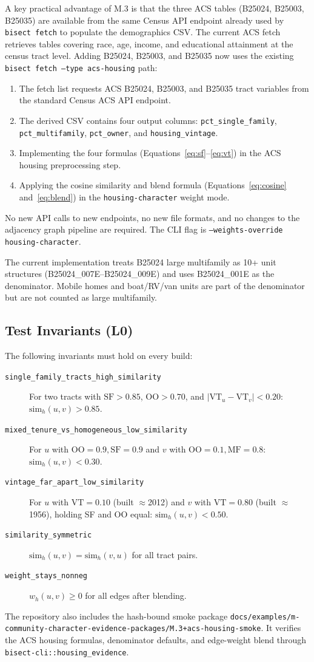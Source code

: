 A key practical advantage of M.3 is that the three ACS tables (B25024, B25003,
B25035) are available from the same Census API endpoint already used by
\texttt{bisect fetch} to populate the demographics CSV.
The current ACS fetch retrieves tables covering race, age, income, and
educational attainment at the census tract level.
Adding B25024, B25003, and B25035 now uses the existing
\texttt{bisect fetch --type acs-housing} path:
\begin{enumerate}
  \item The fetch list requests ACS B25024, B25003, and B25035 tract variables
    from the standard Census ACS API endpoint.
  \item The derived CSV contains four output columns:
    \texttt{pct\_single\_family}, \texttt{pct\_multifamily},
    \texttt{pct\_owner}, and \texttt{housing\_vintage}.
  \item Implementing the four formulas (Equations~\ref{eq:sf}--\ref{eq:vt})
    in the ACS housing preprocessing step.
  \item Applying the cosine similarity and blend formula (Equations~\ref{eq:cosine}
    and~\ref{eq:blend}) in the \texttt{housing-character} weight mode.
\end{enumerate}
No new API calls to new endpoints, no new file formats, and no changes to
the adjacency graph pipeline are required.
The CLI flag is \texttt{--weights-override housing-character}.

The current implementation treats B25024 large multifamily as 10+ unit
structures (B25024\_007E--B25024\_009E) and uses B25024\_001E as the denominator.
Mobile homes and boat/RV/van units are part of the denominator but are not
counted as large multifamily.

\subsection{Test Invariants (L0)}

The following invariants must hold on every build:

\begin{description}
  \item[\texttt{single\_family\_tracts\_high\_similarity}]
    For two tracts with $\mathrm{SF} > 0.85$, $\mathrm{OO} > 0.70$,
    and $|\mathrm{VT}_u - \mathrm{VT}_v| < 0.20$:
    $\mathrm{sim}_h(u,v) > 0.85$.
  \item[\texttt{mixed\_tenure\_vs\_homogeneous\_low\_similarity}]
    For $u$ with $\mathrm{OO} = 0.9, \mathrm{SF} = 0.9$ and
    $v$ with $\mathrm{OO} = 0.1, \mathrm{MF} = 0.8$:
    $\mathrm{sim}_h(u,v) < 0.30$.
  \item[\texttt{vintage\_far\_apart\_low\_similarity}]
    For $u$ with $\mathrm{VT} = 0.10$ (built $\approx$2012) and $v$ with
    $\mathrm{VT} = 0.80$ (built $\approx$1956), holding SF and OO equal:
    $\mathrm{sim}_h(u,v) < 0.50$.
  \item[\texttt{similarity\_symmetric}]
    $\mathrm{sim}_h(u,v) = \mathrm{sim}_h(v,u)$ for all tract pairs.
  \item[\texttt{weight\_stays\_nonneg}]
    $w_h(u,v) \geq 0$ for all edges after blending.
\end{description}

The repository also includes the hash-bound smoke package
\texttt{docs/examples/m-community-character-evidence-packages/M.3+acs-housing-smoke}.
It verifies the ACS housing formulas, denominator defaults, and edge-weight
blend through \texttt{bisect-cli::housing\_evidence}.
